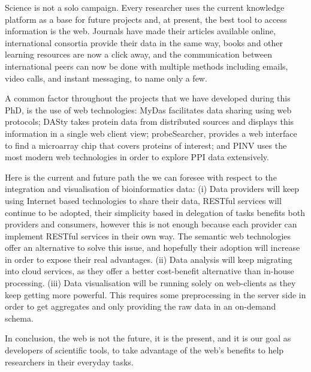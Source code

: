 Science is not a solo campaign. Every researcher uses the current knowledge platform as a base for future projects and, at present, the best tool to access information is the web. Journals have made their articles available online, international consortia provide their data in the same way, books and other learning resources are now a click away, and the communication between international peers can now be done with multiple methods including emails, video calls, and instant messaging, to name only a few.

A common factor throughout the projects that we have developed during this PhD, is the use of web technologies: MyDas facilitates data sharing using web protocols; DASty takes protein data from distributed sources and displays this information in a single web client view; probeSearcher, provides a web interface to find a microarray chip that covers proteins of interest; and PINV uses the most modern web technologies in order to explore PPI data extensively. 

Here is the current and future path the we can foresee with respect to the integration and visualisation of bioinformatics data: (i) Data providers will keep using Internet based technologies to share their data, RESTful services will continue to be adopted, their simplicity based in delegation of tasks benefits both providers and consumers, however this is not enough because each provider can implement RESTful services in their own way. The semantic web technologies offer an alternative to solve this issue, and hopefully their adoption will increase in order to expose their real advantages. (ii) Data analysis will keep migrating into cloud services, as they offer a better cost-benefit alternative than in-house processing. (iii) Data visualisation will be running solely on web-clients as they keep getting more powerful. This requires some preprocessing in the server side in order to get aggregates and only providing the raw data in an on-demand schema.

In conclusion, the web is not the future, it is the present, and it is our goal as developers of scientific tools, to take advantage of the web's benefits to help researchers in their everyday tasks.


